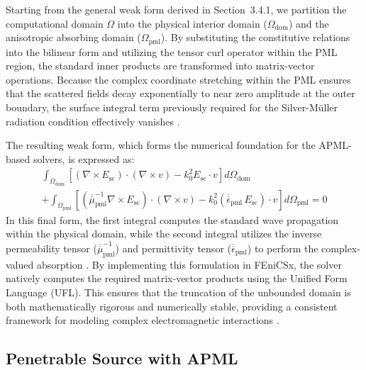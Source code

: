 \vspace{12pt}

Starting from the general weak form derived in Section~3.4.1, we partition the computational domain $\Omega$ into the physical interior domain ($\Omega_{\text{dom}}$) and the anisotropic absorbing domain ($\Omega_{\text{pml}}$). By substituting the constitutive relations into the bilinear form and utilizing the tensor curl operator within the PML region, the standard inner products are transformed into matrix-vector operations. Because the complex coordinate stretching within the PML ensures that the scattered fields decay exponentially to near zero amplitude at the outer boundary, the surface integral term previously required for the Silver-M\"{u}ller radiation condition effectively vanishes \citep{Frelet2024}.

\vspace{12pt}

The resulting weak form, which forms the numerical foundation for the APML-based solvers, is expressed as:
\begin{multline}
\int_{\Omega_{\text{dom}}} \left[ (\nabla \times E_{\text{sc}}) \cdot (\nabla \times v) - k_0^2 E_{\text{sc}} \cdot v \right] d\Omega_{\text{dom}} \\
+ \int_{\Omega_{\text{pml}}} \left[ \left(\overline{\overline{\mu}}_{\text{pml}}^{-1} \nabla \times E_{\text{sc}}\right) \cdot (\nabla \times v) - k_0^2 \left(\overline{\overline{\epsilon}}_{\text{pml}} \, E_{\text{sc}}\right) \cdot v \right] d\Omega_{\text{pml}} = 0
\label{eq:weak_form_pec_pml}
\end{multline}
In this final form, the first integral computes the standard wave propagation within the physical domain, while the second integral utilizes the inverse permeability tensor ($\overline{\overline{\mu}}_{\text{pml}}^{-1}$) and permittivity tensor ($\overline{\overline{\epsilon}}_{\text{pml}}$) to perform the complex-valued absorption \citep{Jiao2003}. By implementing this formulation in FEniCSx, the solver natively computes the required matrix-vector products using the Unified Form Language (UFL). This ensures that the truncation of the unbounded domain is both mathematically rigorous and numerically stable, providing a consistent framework for modeling complex electromagnetic interactions \citep{Jiang2021}.

\subsection{Penetrable Source with APML}

